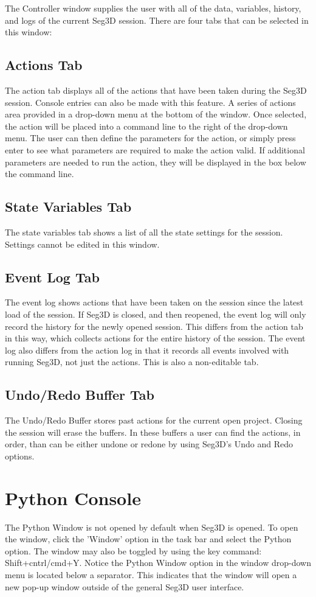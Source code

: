 \documentclass[fleqn,11pt,openany]{book}
\begin{document}
The Controller window supplies the user with all of the data, variables, history, and logs of the current Seg3D session.
There are four tabs that can be selected in this window:

\subsection{Actions Tab}
The action tab displays all of the actions that have been taken during the Seg3D session.
Console entries can also be made with this feature.
A series of actions area provided in a drop-down menu at the bottom of the window.
Once selected, the action will be placed into a command line to the right of the drop-down menu.
The user can then define the parameters for the action, or simply press enter to see what parameters are required to make the action valid.
If additional parameters are needed to run the action, they will be displayed in the box below the command line.

\subsection{State Variables Tab}
The state variables tab  shows a list of all the state settings for the session.
Settings cannot be edited in this window.

\subsection{Event Log Tab}
The event log shows actions that have been taken on the session since the latest load of the session.
If Seg3D is closed, and then reopened, the event log will only record the history for the newly opened session.
This differs from the action tab in this way, which collects actions for the entire history of the session.
The event log also differs from the action log in that it records all events involved with running Seg3D, not just the actions.
This is also a non-editable tab.

\subsection{Undo/Redo Buffer Tab}
The Undo/Redo Buffer stores past actions for the current open project.
Closing the session will erase the buffers.
In these buffers a user can find the actions, in order, than can be either undone or redone by using Seg3D's Undo and Redo options.


\section{Python Console}
The Python Window is not opened by default when Seg3D is opened.  To open the window, click the 'Window' option in the task bar and select the Python option.  The window may also be toggled by using the key command: Shift+cntrl/cmd+Y.
Notice the Python Window option in the window drop-down menu is located below a separator.  
This indicates that the window will open a new pop-up window outside of the general Seg3D user interface.
\end{document}
